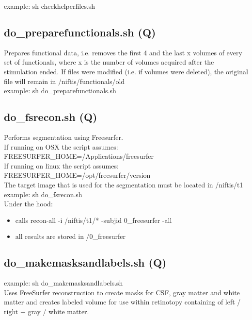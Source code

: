 \documentclass[12pt,a4paper]{scrartcl}
\begin{document}
\noindent example: sh checkhelperfiles.sh

\subsection{do\_preparefunctionals.sh (Q)}
Prepares functional data, i.e. removes the first 4 and the last x volumes of every set of functionals, where x is the number of volumes acquired after the stimulation ended. If files were modified (i.e. if volumes were deleted), the original file will remain in /niftis/functionals/old\\

\noindent example: sh do\_preparefunctionals.sh\\

\subsection{do\_fsrecon.sh (Q)}
Performs segmentation using Freesurfer.\\

\noindent If running on OSX the script assumes:\\
\noindent FREESURFER\_HOME=/Applications/freesurfer\\ 

\noindent If running on linux the script assumes:\\
\noindent FREESURFER\_HOME=/opt/freesurfer/version\\

\noindent The target image that is used for the segmentation must be located in /niftis/t1\\

\noindent example: sh do\_fsrecon.sh\\

\noindent Under the hood:
\begin{itemize}
\item calls recon-all -i /niftis/t1/* -subjid  0\_freesurfer -all
\item all results are stored in /0\_freesurfer
\end{itemize}

\subsection{do\_makemasksandlabels.sh (Q)}
example: sh do\_makemasksandlabels.sh\\

\noindent Uses FreeSurfer reconstruction to create masks for CSF, gray matter and white matter and creates labeled volume for use within retinotopy containing of left / right + gray / white matter.\\
\end{document}
